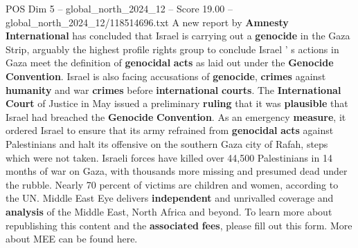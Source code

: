 \begin{textsample}{POS Dim 5 – global\_north\_2024\_12 – Score 19.00 – global\_north\_2024\_12/118514696.txt}
A new report by \textbf{Amnesty} \textbf{International} has concluded that Israel is carrying out a \textbf{genocide} in the Gaza Strip, arguably the highest profile rights group to conclude Israel ' s actions in Gaza meet the definition of \textbf{genocidal} \textbf{acts} as laid out under the \textbf{Genocide} \textbf{Convention}.
Israel is also facing accusations of \textbf{genocide}, \textbf{crimes} against \textbf{humanity} and war \textbf{crimes} before \textbf{international} \textbf{courts}.
The \textbf{International} \textbf{Court} of Justice in May issued a preliminary \textbf{ruling} that it was \textbf{plausible} that Israel had breached the \textbf{Genocide} \textbf{Convention}.
As an emergency \textbf{measure}, it ordered Israel to ensure that its army refrained from \textbf{genocidal} \textbf{acts} against Palestinians and halt its offensive on the southern Gaza city of Rafah, steps which were not taken.
Israeli forces have killed over 44,500 Palestinians in 14 months of war on Gaza, with thousands more missing and presumed dead under the rubble.
Nearly 70 percent of victims are children and women, according to the UN.
Middle East Eye delivers \textbf{independent} and unrivalled coverage and \textbf{analysis} of the Middle East, North Africa and beyond.
To learn more about republishing this content and the \textbf{associated} \textbf{fees}, please fill out this form.
More about MEE can be found here.

\end{textsample}
